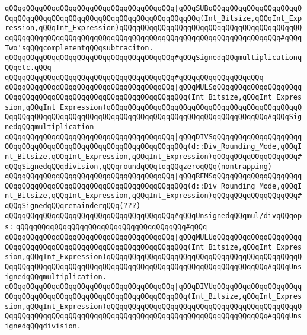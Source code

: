 \verb|qQQqqQQqqQQqqQQqqQQqqQQqqQQqqQQqqQQqqQQq|\verb#|qQQqSUBqQQqqQQqqQQqqQQqqQQqqQQqqQQqqQQqqQQqqQQqqQQqqQQqqQQqqQQqqQQqqQQqqQQq(Int_Bitsize,qQQqInt_Expression,qQQqInt_Expression)qQQqqQQqqQQqqQQqqQQqqQQqqQQqqQQqqQQqqQQqqQQqqQQqqQQqqQQqqQQqqQQqqQQqqQQqqQQqqQQqqQQqqQQqqQQqqQQqqQQqqQQqqQQq#\verb|#qQQqTwo'sqQQqcomplementqQQqsubtraciton.|\newline
\newline
\verb|qQQqqQQqqQQqqQQqqQQqqQQqqQQqqQQqqQQqqQQq#qQQqSignedqQQqmultiplicationqQQqetc.qQQq|\newline
\verb|qQQqqQQqqQQqqQQqqQQqqQQqqQQqqQQqqQQqqQQq#qQQqqQQqqQQqqQQqqQQq|\newline
\verb|qQQqqQQqqQQqqQQqqQQqqQQqqQQqqQQqqQQqqQQq|\verb#|qQQqMULSqQQqqQQqqQQqqQQqqQQqqQQqqQQqqQQqqQQqqQQqqQQqqQQqqQQqqQQqqQQqqQQq(Int_Bitsize,qQQqInt_Expression,qQQqInt_Expression)qQQqqQQqqQQqqQQqqQQqqQQqqQQqqQQqqQQqqQQqqQQqqQQqqQQqqQQqqQQqqQQqqQQqqQQqqQQqqQQqqQQqqQQqqQQqqQQqqQQqqQQqqQQq#\verb|#qQQqSignedqQQqmultiplication|\newline
\verb|qQQqqQQqqQQqqQQqqQQqqQQqqQQqqQQqqQQqqQQq|\verb#|qQQqDIVSqQQqqQQqqQQqqQQqqQQqqQQqqQQqqQQqqQQqqQQqqQQqqQQqqQQqqQQqqQQqqQQq(d::Div_Rounding_Mode,qQQqInt_Bitsize,qQQqInt_Expression,qQQqInt_Expression)qQQqqQQqqQQqqQQqqQQq#\verb|#qQQqSignedqQQqdivision,qQQqroundqQQqtoqQQqzeroqQQq(nontrapping)|\newline
\verb|qQQqqQQqqQQqqQQqqQQqqQQqqQQqqQQqqQQqqQQq|\verb#|qQQqREMSqQQqqQQqqQQqqQQqqQQqqQQqqQQqqQQqqQQqqQQqqQQqqQQqqQQqqQQqqQQqqQQq(d::Div_Rounding_Mode,qQQqInt_Bitsize,qQQqInt_Expression,qQQqInt_Expression)qQQqqQQqqQQqqQQqqQQq#\verb|#qQQqSignedqQQqremainderqQQq(???)|\newline
\newline
\verb|qQQqqQQqqQQqqQQqqQQqqQQqqQQqqQQqqQQqqQQq#qQQqUnsignedqQQqmul/divqQQqops:|\newline
\verb|qQQqqQQqqQQqqQQqqQQqqQQqqQQqqQQqqQQqqQQq#qQQq|\newline
\verb|qQQqqQQqqQQqqQQqqQQqqQQqqQQqqQQqqQQqqQQq|\verb#|qQQqMULUqQQqqQQqqQQqqQQqqQQqqQQqqQQqqQQqqQQqqQQqqQQqqQQqqQQqqQQqqQQqqQQq(Int_Bitsize,qQQqInt_Expression,qQQqInt_Expression)qQQqqQQqqQQqqQQqqQQqqQQqqQQqqQQqqQQqqQQqqQQqqQQqqQQqqQQqqQQqqQQqqQQqqQQqqQQqqQQqqQQqqQQqqQQqqQQqqQQqqQQqqQQq#\verb|#qQQqUnsignedqQQqmultiplication.|\newline
\verb|qQQqqQQqqQQqqQQqqQQqqQQqqQQqqQQqqQQqqQQq|\verb#|qQQqDIVUqQQqqQQqqQQqqQQqqQQqqQQqqQQqqQQqqQQqqQQqqQQqqQQqqQQqqQQqqQQqqQQq(Int_Bitsize,qQQqInt_Expression,qQQqInt_Expression)qQQqqQQqqQQqqQQqqQQqqQQqqQQqqQQqqQQqqQQqqQQqqQQqqQQqqQQqqQQqqQQqqQQqqQQqqQQqqQQqqQQqqQQqqQQqqQQqqQQqqQQqqQQq#\verb|#qQQqUnsignedqQQqdivision.|\newline
